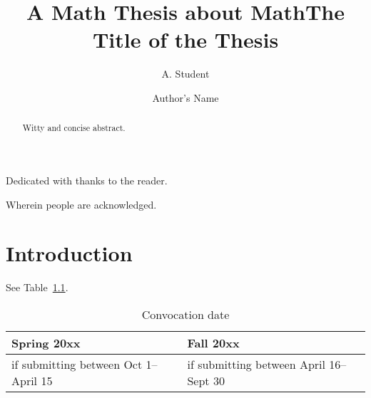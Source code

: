 \documentclass[12pt,openany,twoside]{report}
\def\ThesisTitle{The Title of the Thesis}
\def\ThesisAuthor{Author's Name}
\begin{document}
\def\thechapter       {\arabic{chapter}}
\def\thesection       {\arabic{chapter}.\Alph{section}}
\def\thefigure        {\arabic{chapter}.\arabic{figure}}
\def\theequation      {\arabic{chapter}.\arabic{equation}}

\thispagestyle{empty}

\title{A Math Thesis about Math}

\author{A. Student}



\title{\ThesisTitle}
\author{\ThesisAuthor}

\titlepage

\begin{abstract}
Witty and concise abstract.
\end{abstract}

\thispagestyle{plain}


\begin{dedication}
\vspace*{5cm}
\begin{center}
\Large
Dedicated with thanks to the reader.
\end{center}
\end{dedication}

\doublespacing

\begin{acknowledgement}
Wherein people are acknowledged.
\end{acknowledgement}

\tableofcontents
\listoffigures

\chapter{Introduction}

See Table~\ref{egtable}.

\begin{table}[htbp]
  \begin{center}
    \begin{tabular}{|p{4cm}|p{4cm}|}
      \hline
      Spring 20xx & Fall 20xx \\
      \hline
      \hline
      if submitting between Oct 1--April 15
      & if submitting between April 16--Sept 30\\
      \hline
    \end{tabular}
    \caption{Convocation date}
    \label{egtable}
  \end{center}
\end{table}
\end{document}
